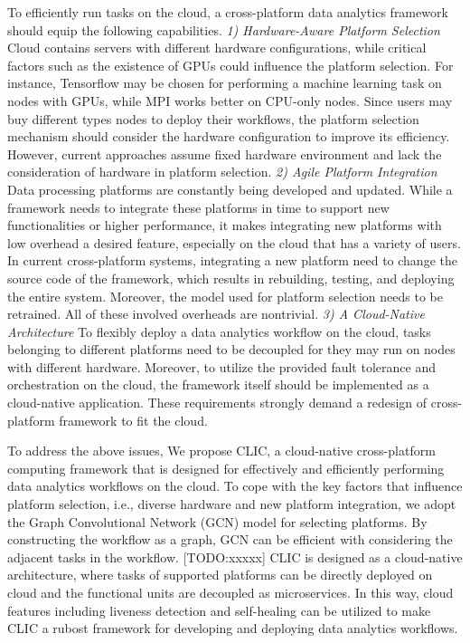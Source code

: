 To efficiently run tasks on the cloud, a cross-platform data analytics framework should equip the following capabilities. \textit{1) Hardware-Aware Platform Selection} Cloud contains servers with different hardware configurations, while critical factors such as the existence of GPUs could influence the platform selection. For instance, Tensorflow may be chosen for performing a machine learning task on nodes with GPUs, while MPI works better on CPU-only nodes.  Since users may buy different types nodes to deploy their workflows, the platform selection mechanism should consider the hardware configuration to improve its efficiency. However, current approaches assume fixed hardware environment and lack the consideration of hardware in platform selection.  
\textit{2) Agile Platform Integration} Data processing platforms are constantly being developed and updated. While a framework needs to integrate these platforms in time to support new functionalities or higher performance, it makes integrating new platforms with low overhead a desired feature, especially on the cloud that has a variety of users. In current cross-platform systems, integrating a new platform need to change the source code of the framework, which results in rebuilding, testing, and deploying the entire system. Moreover, the model used for platform selection needs to be retrained. All of these involved overheads are nontrivial. 
\textit{3) A Cloud-Native Architecture} To flexibly deploy a data analytics workflow on the cloud, tasks belonging to different platforms need to be decoupled for they may run on nodes with different hardware. Moreover, to utilize the provided fault tolerance and orchestration on the cloud, the framework itself should be implemented as a cloud-native application. These requirements strongly demand a redesign of cross-platform framework to fit the cloud.



To address the above issues, We propose CLIC, a cloud-native cross-platform computing framework that is designed for effectively and efficiently performing data analytics workflows on the cloud.
To cope with the key factors that influence platform selection, i.e., diverse hardware and new platform integration, we adopt the Graph Convolutional Network (GCN) model for selecting platforms. By constructing the workflow as a graph, GCN can be efficient with considering the adjacent tasks in the workflow. [TODO:xxxxx]
CLIC is designed as a cloud-native architecture, where tasks of supported platforms can be directly deployed on cloud and the functional units are decoupled as microservices. In this way, cloud features including liveness detection and self-healing can be utilized to make CLIC a rubost framework for developing and deploying data analytics workflows. 


